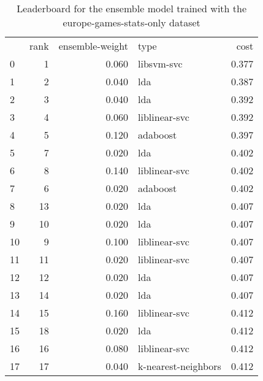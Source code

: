 \begin{table}[]
	\centering
	\begin{tabular}{lrrlr}
		   & rank & ensemble-weight & type                & cost  \\
		0  & 1    & 0.060           & libsvm-svc          & 0.377 \\
		1  & 2    & 0.040           & lda                 & 0.387 \\
		2  & 3    & 0.040           & lda                 & 0.392 \\
		3  & 4    & 0.060           & liblinear-svc       & 0.392 \\
		4  & 5    & 0.120           & adaboost            & 0.397 \\
		5  & 7    & 0.020           & lda                 & 0.402 \\
		6  & 8    & 0.140           & liblinear-svc       & 0.402 \\
		7  & 6    & 0.020           & adaboost            & 0.402 \\
		8  & 13   & 0.020           & lda                 & 0.407 \\
		9  & 10   & 0.020           & lda                 & 0.407 \\
		10 & 9    & 0.100           & liblinear-svc       & 0.407 \\
		11 & 11   & 0.020           & liblinear-svc       & 0.407 \\
		12 & 12   & 0.020           & lda                 & 0.407 \\
		13 & 14   & 0.020           & lda                 & 0.407 \\
		14 & 15   & 0.160           & liblinear-svc       & 0.412 \\
		15 & 18   & 0.020           & lda                 & 0.412 \\
		16 & 16   & 0.080           & liblinear-svc       & 0.412 \\
		17 & 17   & 0.040           & k-nearest-neighbors & 0.412 \\
	\end{tabular}

	\caption{Leaderboard for the ensemble model trained with the europe-games-stats-only dataset}
	\label{tab:lb-europe-games-stats-only}
\end{table}


